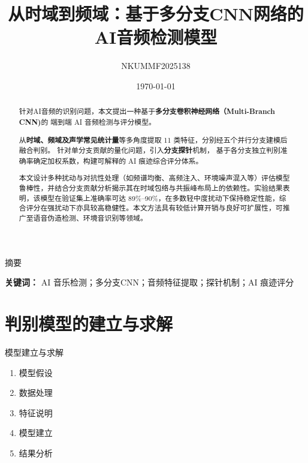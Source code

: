 \documentclass[aspectratio=169]{beamer}
\title{从时域到频域：基于多分支CNN网络的AI音频检测模型}
\author{NKUMMF2025138}
\date{\today}
\begin{document}
\begin{frame}
  \titlepage
\end{frame}


\begin{frame}{摘要}
\small

\vspace{0.2cm}

\begin{abstract}
针对AI音频的识别问题，本文提出一种基于\textbf{多分支卷积神经网络（Multi-Branch CNN)}的
端到端 AI 音频检测与评分模型。

从\textbf{时域、频域及声学常见统计量}等多角度提取 11 类特征，分别经五个并行分支建模后融合判别。
针对单分支贡献的量化问题，引入\textbf{分支探针}机制，
基于各分支独立判别准确率确定加权系数，构建可解释的 AI 痕迹综合评分体系。

本文设计多种扰动与对抗性处理（如频谱均衡、高频注入、环境噪声混入等）评估模型鲁棒性，并结合分支贡献分析揭示其在时域包络与共振峰布局上的依赖性。实验结果表明，该模型在验证集上准确率可达 89\%–90\%，在多数轻中度扰动下保持稳定性能，综合评分在强扰动下亦具较高稳健性。本文方法具有较低计算开销与良好可扩展性，可推广至语音伪造检测、环境音识别等领域。

\end{abstract}

\vspace{0.5em}
\noindent\textbf{关键词：} AI 音乐检测；多分支CNN；音频特征提取；探针机制；AI 痕迹评分

\end{frame}




\section{判别模型的建立与求解}

\begin{frame}{模型建立与求解}
\small
\begin{enumerate}
  \item{模型假设}
  \item{数据处理}
  \item{特征说明}
  \item{模型建立}
  \item{结果分析}
\end{enumerate}
\end{frame}
\end{document}

